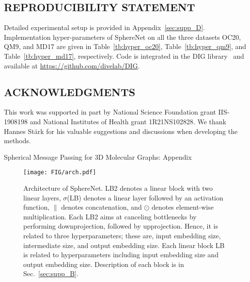 \documentclass{article}
\begin{document}
\newpage
\subsection*{REPRODUCIBILITY STATEMENT}
Detailed experimental setup is provided in Appendix~\ref{sec:supp_D}. 
Implementation hyper-parameters of SphereNet
on all the three datasets OC20, QM9, and MD17 are given in Table~\ref{tb:hyper_oc20}, Table~\ref{tb:hyper_qm9},
and Table~\ref{tb:hyper_md17}, respectively.
Code is integrated in the DIG 
library~\citep{liu2021dig}
and available 
at \url{https://github.com/divelab/DIG}.

\subsection*{ACKNOWLEDGMENTS}
This work was supported in part by National Science Foundation grant IIS-1908198 and National Institutes of Health
grant 1R21NS102828. 
We thank Hannes Stärk for his valuable suggestions and discussions when developing the methods.








\clearpage
\appendix

\setcounter{page}{1}


\begin{center}

    \Large{Spherical Message Passing for 3D Molecular Graphs: Appendix}

\end{center}


\begin{figure}[th!]
    \centering
    \texttt{[image: FIG/arch.pdf]}
    \vspace{-6pt}
    \caption{Architecture of SphereNet. LB2 denotes a linear block with two linear layers, $\sigma$(LB) denotes a linear layer followed by an activation function, $\|$ denotes concatenation, and $\odot$ denotes element-wise multiplication.
    Each LB2 aims at canceling bottlenecks by performing downprojection,
    followed by upprojection.
    Hence, it is related to three hyperparameters; these are, 
    input embedding size, intermediate size, and output embedding size.
    Each linear block LB is related to hyperparameters including input embedding size and output embedding size.
    Description of each block is in Sec.~\ref{sec:supp_B}.
    }\label{fig:arch}
    \vspace{-10 pt}
\end{figure}
\end{document}
